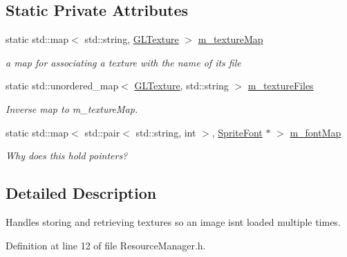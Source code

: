 \subsection*{Static Private Attributes}
\begin{DoxyCompactItemize}
\item 
\mbox{\label{classnta_1_1ResourceManager_abf9bb10402834f05b2673e0c1d8cb9aa}} 
static std\+::map$<$ std\+::string, \hyperlink{structnta_1_1GLTexture}{G\+L\+Texture} $>$ \hyperlink{classnta_1_1ResourceManager_abf9bb10402834f05b2673e0c1d8cb9aa}{m\+\_\+texture\+Map}
\begin{DoxyCompactList}\small\item\em a map for associating a texture with the name of its file \end{DoxyCompactList}\item 
\mbox{\label{classnta_1_1ResourceManager_a4255640b4c0ba44f1ad8289d3d912897}} 
static std\+::unordered\+\_\+map$<$ \hyperlink{structnta_1_1GLTexture}{G\+L\+Texture}, std\+::string $>$ \hyperlink{classnta_1_1ResourceManager_a4255640b4c0ba44f1ad8289d3d912897}{m\+\_\+texture\+Files}
\begin{DoxyCompactList}\small\item\em Inverse map to m\+\_\+texture\+Map. \end{DoxyCompactList}\item 
\mbox{\label{classnta_1_1ResourceManager_ac6a87b69211ba52452b4c02847ea934e}} 
static std\+::map$<$ std\+::pair$<$ std\+::string, int $>$, \hyperlink{classnta_1_1SpriteFont}{Sprite\+Font} $\ast$ $>$ \hyperlink{classnta_1_1ResourceManager_ac6a87b69211ba52452b4c02847ea934e}{m\+\_\+font\+Map}
\begin{DoxyCompactList}\small\item\em Why does this hold pointers? \end{DoxyCompactList}\end{DoxyCompactItemize}


\subsection{Detailed Description}
Handles storing and retrieving textures so an image isn\textquotesingle{}t loaded multiple times. 

Definition at line 12 of file Resource\+Manager.\+h.



